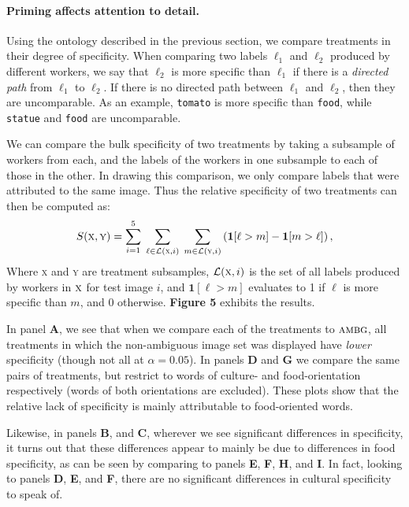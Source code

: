 \documentclass[a4paper]{report}
\begin{document}
\paragraph{Priming affects attention to detail.} Using the ontology described
in the previous section, we compare treatments in their degree of specificity.
When comparing two labels $\ell_1$ and $\ell_2$ produced by different workers,
we say that $\ell_2$ is more specific than $\ell_1$ if there is a 
\textit{directed path} from $\ell_1$ to $\ell_2$.  If there is no directed path
between $\ell_1$ and $\ell_2$, then they are uncomparable.  As an example,
\texttt{tomato} is more specific than \texttt{food}, while \texttt{statue}
and \texttt{food} are uncomparable.

We can compare the bulk specificity of two treatments by taking a subsample
of workers from each, and the labels of the workers in one
subsample to each of those in the other.  In drawing this comparison, we only 
compare labels that were attributed to the same image.  Thus the relative 
specificity of two treatments can then be computed as:
\begin{align}
	S(\textsc{x},\textsc{y}) = 
		\sum_{i=1}^5 \; 
		\sum_{\ell\in \mathcal{L}(\textsc{x},i)} \;
		\sum_{m\in \mathcal{L}
		(\textsc{y},i)} \left(\mathbf{1}[\ell > m] 
		- \mathbf{1}[m>\ell]\right),
\end{align}
Where \textsc{x} and \textsc{y} are treatment subsamples,
$\mathcal{L}(\textsc{x},i)$ is the set of all labels produced by workers in 
$\textsc{x}$ for test image $i$, and $\mathbf{1}[\ell > m]$ evaluates to 1 if 
$\ell$ is more specific than $m$, and 0 otherwise.  \textbf{Figure 5} 
exhibits the results.

In panel \textbf{A}, we see that when we compare each of the treatments to
$\textsc{ambg}$, all treatments in which the non-ambiguous image set was 
displayed have \textit{lower} specificity (though not all at $\alpha=0.05$).  
In panels \textbf{D} and \textbf{G} we compare the same pairs of treatments, 
but restrict to words of culture- and food-orientation respectively (words
of both orientations are excluded).  These plots show that the relative lack of specificity is mainly attributable to food-oriented words.  

Likewise, in panels \textbf{B}, and \textbf{C}, 
wherever we see significant differences in specificity, it turns out that
these differences appear to mainly be due to differences in food specificity,
as can be seen by comparing to panels \textbf{E}, \textbf{F}, \textbf{H}, and 
\textbf{I}.  In fact, looking to panels \textbf{D}, \textbf{E}, and \textbf{F},
there are no significant differences in cultural specificity to speak of. 
\end{document}
